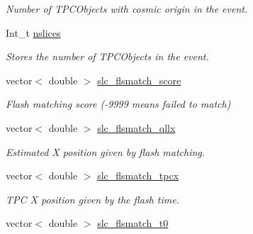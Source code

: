 \begin{DoxyCompactItemize}
\begin{DoxyCompactList}\small\item\em Number of T\-P\-C\-Objects with cosmic origin in the event. \end{DoxyCompactList}\item 
\hypertarget{classUBXSecEvent_abcf4435958fac040ad4e3c85802eea27}{Int\-\_\-t \hyperlink{classUBXSecEvent_abcf4435958fac040ad4e3c85802eea27}{nslices}}\label{classUBXSecEvent_abcf4435958fac040ad4e3c85802eea27}

\begin{DoxyCompactList}\small\item\em Stores the number of T\-P\-C\-Objects in the event. \end{DoxyCompactList}\item 
\hypertarget{classUBXSecEvent_aac7860c3885997956aabf560254afb42}{vector$<$ double $>$ \hyperlink{classUBXSecEvent_aac7860c3885997956aabf560254afb42}{slc\-\_\-flsmatch\-\_\-score}}\label{classUBXSecEvent_aac7860c3885997956aabf560254afb42}

\begin{DoxyCompactList}\small\item\em Flash matching score (-\/9999 means failed to match) \end{DoxyCompactList}\item 
\hypertarget{classUBXSecEvent_abc1d1ba9d1ce91ae8784f3e99deb6ebb}{vector$<$ double $>$ \hyperlink{classUBXSecEvent_abc1d1ba9d1ce91ae8784f3e99deb6ebb}{slc\-\_\-flsmatch\-\_\-qllx}}\label{classUBXSecEvent_abc1d1ba9d1ce91ae8784f3e99deb6ebb}

\begin{DoxyCompactList}\small\item\em Estimated X position given by flash matching. \end{DoxyCompactList}\item 
\hypertarget{classUBXSecEvent_afc096cb78a5130678717f9c513e6b90c}{vector$<$ double $>$ \hyperlink{classUBXSecEvent_afc096cb78a5130678717f9c513e6b90c}{slc\-\_\-flsmatch\-\_\-tpcx}}\label{classUBXSecEvent_afc096cb78a5130678717f9c513e6b90c}

\begin{DoxyCompactList}\small\item\em T\-P\-C X position given by the flash time. \end{DoxyCompactList}\item 
\hypertarget{classUBXSecEvent_af4f355424e0a80580b581268eb25dd12}{vector$<$ double $>$ \hyperlink{classUBXSecEvent_af4f355424e0a80580b581268eb25dd12}{slc\-\_\-flsmatch\-\_\-t0}}\label{classUBXSecEvent_af4f355424e0a80580b581268eb25dd12}


\end{DoxyCompactItemize}
